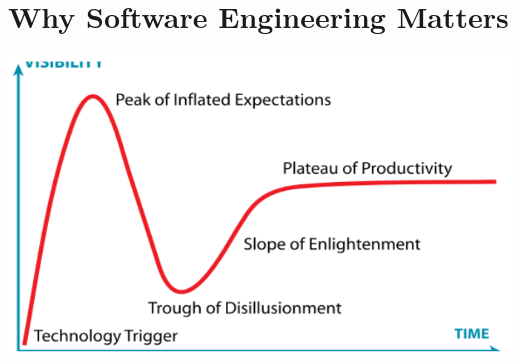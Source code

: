 \documentclass{article}[18pt]
\begin{document}
\section{Why Software Engineering Matters}
\begin{center}
	\includegraphics[scale=0.7]{"Hype Cycle"}
\end{center}
\end{document}
